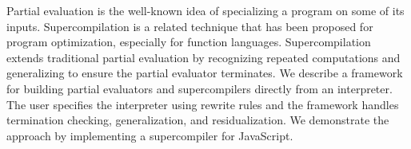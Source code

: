 
Partial evaluation is the well-known idea of specializing a program
on some of its inputs. 
Supercompilation is a related technique 
that has been proposed for program optimization, especially
for function languages.
Supercompilation extends traditional partial evaluation by recognizing repeated computations and generalizing to ensure the partial evaluator terminates.
We describe a framework for building partial evaluators and supercompilers 
directly from an interpreter.
The user specifies the interpreter using rewrite rules
and the framework 
handles termination checking, generalization, and residualization.
We demonstrate the approach by implementing a supercompiler for
JavaScript.
